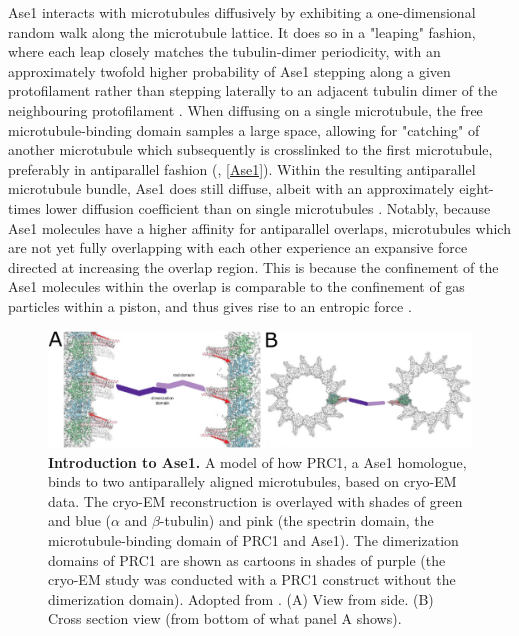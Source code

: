 Ase1 interacts with microtubules diffusively by exhibiting a one-dimensional random walk along the microtubule lattice. It does so in a "leaping" fashion, where each leap closely matches the tubulin-dimer periodicity, with an approximately twofold higher probability of Ase1 stepping along a given protofilament rather than stepping laterally to an adjacent tubulin dimer of the neighbouring protofilament . When diffusing on a single microtubule, the free microtubule-binding domain samples a large space, allowing for "catching" of another microtubule which subsequently is crosslinked to the first microtubule, preferably in antiparallel fashion (\cite{Janson2007}, \autoref{Ase1}). Within the resulting antiparallel microtubule bundle, Ase1 does still diffuse, albeit with an approximately eight-times lower diffusion coefficient than on single microtubules \parencite{lanskydiffusible2015}. Notably, because Ase1 molecules have a higher affinity for antiparallel overlaps, microtubules which are not yet fully overlapping with each other experience an expansive force directed at increasing the overlap region. This is because the confinement of the Ase1 molecules within the overlap is comparable to the confinement of gas particles within a piston, and thus gives rise to an entropic force .\par

\begin{figure}[h!tb]
\centering
\includegraphics[width=\linewidth]{Figures/Ase1.png}
\caption[Introduction to Ase1.]{
\textbf{Introduction to Ase1.} A model of how PRC1, a Ase1 homologue, binds to two antiparallely aligned microtubules, based on cryo-EM data. The cryo-EM reconstruction is overlayed with shades of green and blue ($\alpha$ and $\beta$-tubulin) and pink (the spectrin domain, the microtubule-binding domain of PRC1 and Ase1). The dimerization domains of PRC1 are shown as cartoons in shades of purple (the cryo-EM study was conducted with a PRC1 construct without the dimerization domain). Adopted from \cite{Kellogg2016}. (A) View from side. (B) Cross section view (from bottom of what panel A shows). 
	}\label{Ase1}
\end{figure}